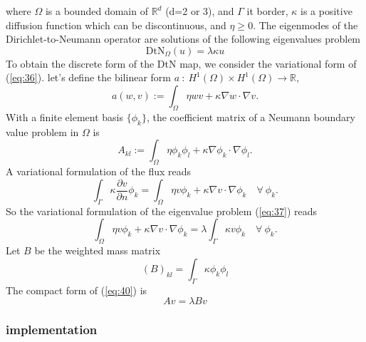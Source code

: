 where $\Omega$ is a bounded domain of $\mathbb R^d$ (d=2 or 3), and $\Gamma$ it border, $\kappa$ is a positive
diffusion function which can be discontinuous, and $\eta \geq 0$. The eigenmodes of the Dirichlet-to-Neumann
operator are solutions of the following eigenvalues problem
\begin{equation}
  \label{eq:37}
  \text{DtN}_{\Omega}(u) = \lambda \kappa u
\end{equation}
To obtain the discrete form of the DtN map, we consider the variational form of (\ref{eq:36}). let's define the
bilinear form $a~:~H^1(\Omega) \times H^1(\Omega) \longrightarrow \mathbb R $,
\begin{equation*}
  \label{eq:41}
  a(w,v) := \int_\Omega \eta w v + \kappa \nabla w \cdot \nabla v .
\end{equation*}
With a finite element basis $\{ \phi_k \}$, the coefficient matrix of a Neumann boundary value problem in $\Omega$ is
\begin{equation*}
\label{eq:42}
  A_{kl} := \int_\Omega \eta \phi_k \phi_l + \kappa \nabla \phi_k \cdot \nabla \phi_l .
\end{equation*}
A variational formulation of the flux reads
\begin{equation*}
  \label{eq:43}
\int_\Gamma \kappa \dfrac{\partial v}{\partial n} \phi_k = \int_\Omega \eta v \phi_k + \kappa \nabla v \cdot \nabla \phi_k \quad \forall~ \phi_k.
\end{equation*}
So the variational formulation of the eigenvalue problem (\ref{eq:37}) reads
\begin{equation}
\label{eq:40}
 \int_\Omega \eta v \phi_k + \kappa \nabla v \cdot \nabla \phi_k = \lambda \int_\Gamma \kappa v \phi_k  \quad \forall~ \phi_k.
\end{equation}
Let $B$ be the weighted mass matrix
\begin{equation*}
  \label{eq:44}
  (B)_{kl} = \int_\Gamma \kappa \phi_k \phi_l
\end{equation*}
The compact form of (\ref{eq:40}) is
\begin{equation}
  \label{eq:45}
  Av = \lambda B v
\end{equation}

\subsubsection{\FEEL implementation}
\label{sec:feel-implementation-1}

